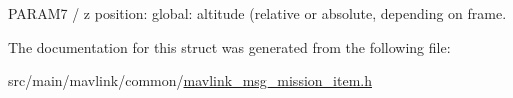 P\+A\+R\+A\+M7 / z position\+: global\+: altitude (relative or absolute, depending on frame. 



The documentation for this struct was generated from the following file\+:\begin{DoxyCompactItemize}
\item 
src/main/mavlink/common/\hyperlink{mavlink__msg__mission__item_8h}{mavlink\+\_\+msg\+\_\+mission\+\_\+item.\+h}\end{DoxyCompactItemize}
